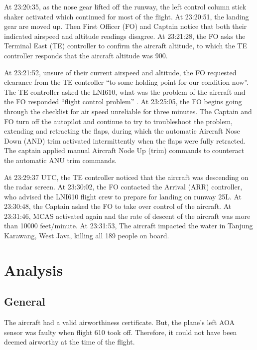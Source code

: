 \documentclass[
  10pt,
  promotesection,
  endnotes,
  draft,
]{memreport}
\begin{document}
  At 23:20:35, as the nose gear lifted off the runway, the left control column stick shaker activated which continued for most of the flight. At 23:20:51, the landing gear are moved up. Then First Officer (FO) and Captain notice that both their indicated airspeed and altitude readings disagree. At 23:21:28, the FO asks the Terminal East (TE) controller to confirm the aircraft altitude, to which the TE controller responds that the aircraft altitude was 900\autocite[\nopp{}20]{noauthor_aircraft_2019}.

  At 23:21:52, unsure of their current airspeed and altitude, the FO requested clearance from the TE controller ``to some holding point for our condition now''. The TE controller asked the LNI610, what was the problem of the aircraft and the FO responded ``flight control problem'' \autocite[\nopp{}21]{noauthor_aircraft_2019}. At 23:25:05, the FO begins going through the checklist for air speed unreliable for three minutes. The Captain and FO turn off the autopilot and continue to try to troubleshoot the problem, extending and retracting the flaps, during which the automatic Aircraft Nose Down (AND) trim activated intermittently when the flaps were fully retracted. The captain applied manual Aircraft Node Up (trim) commands to counteract the automatic ANU trim commands\autocite[\nopp{}22-26]{noauthor_aircraft_2019}.

  At 23:29:37 UTC, the TE controller noticed that the aircraft was descending on the radar screen. At 23:30:02, the FO contacted the Arrival (ARR) controller, who advised the LNI610 flight crew to prepare for landing on runway 25L. At 23:30:48, the Captain asked the FO to take over control of the aircraft\autocite[\nopp{}26]{noauthor_aircraft_2019}. At 23:31:46, MCAS activated again and the rate of descent of the aircraft was more than \num{10 000} feet/minute. At 23:31:53, The aircraft impacted the water in Tanjung Karawang, West Java, killing all 189 people on board\autocite[\nopp{}27]{noauthor_aircraft_2019}.

  \section{Analysis}
  \subsection{General}
  The aircraft had a valid airworthiness certificate. But, the plane's left AOA sensor was faulty when flight 610 took off. Therefore, it could not have been deemed airworthy at the time of the flight.
\end{document}
